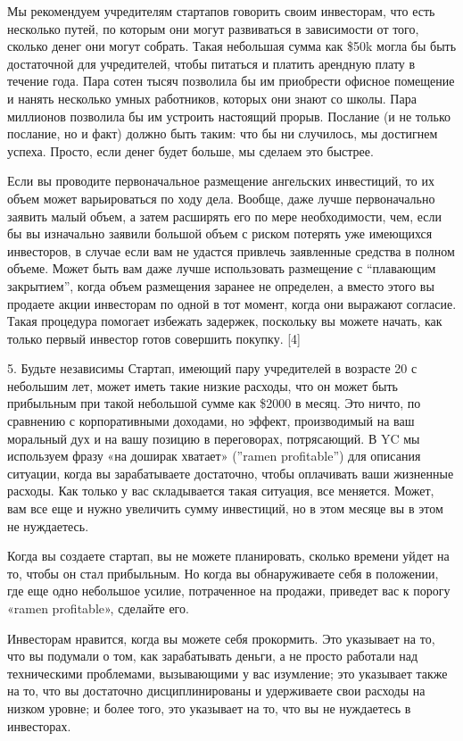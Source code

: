 \documentclass[ebook,12pt,oneside,openany]{memoir}
\begin{document}
Мы рекомендуем учредителям стартапов говорить своим инвесторам, что
есть несколько путей, по которым они могут развиваться в зависимости
от того, сколько денег они могут собрать. Такая небольшая сумма как
\$50k могла бы быть достаточной для учредителей, чтобы питаться и
платить арендную плату в течение года. Пара сотен тысяч позволила бы
им приобрести офисное помещение и нанять несколько умных работников,
которых они знают со школы. Пара миллионов позволила бы им устроить
настоящий прорыв. Послание (и не только послание, но и факт) должно
быть таким: что бы ни случилось, мы достигнем успеха. Просто, если
денег будет больше, мы сделаем это быстрее.

Если вы проводите первоначальное размещение ангельских инвестиций, то
их объем может варьироваться по ходу дела. Вообще, даже лучше
первоначально заявить малый объем, а затем расширять его по мере
необходимости, чем, если бы вы изначально заявили большой объем с
риском потерять уже имеющихся инвесторов, в случае если вам не удастся
привлечь заявленные средства в полном объеме. Может быть вам даже
лучше использовать размещение с “плавающим закрытием”, когда объем
размещения заранее не определен, а вместо этого вы продаете акции
инвесторам по одной в тот момент, когда они выражают согласие. Такая
процедура помогает избежать задержек, поскольку вы можете начать, как
только первый инвестор готов совершить покупку. [4]

5. Будьте независимы Стартап, имеющий пару учредителей в возрасте 20 с
небольшим лет, может иметь такие низкие расходы, что он может быть
прибыльным при такой небольшой сумме как \$2000 в месяц. Это ничто, по
сравнению с корпоративными доходами, но эффект, производимый на ваш
моральный дух и на вашу позицию в переговорах, потрясающий. В YC мы
используем фразу «на доширак хватает» (”ramen profitable”) для
описания ситуации, когда вы зарабатываете достаточно, чтобы оплачивать
ваши жизненные расходы. Как только у вас складывается такая ситуация,
все меняется. Может, вам все еще и нужно увеличить сумму инвестиций,
но в этом месяце вы в этом не нуждаетесь.

Когда вы создаете стартап, вы не можете планировать, сколько времени
уйдет на то, чтобы он стал прибыльным. Но когда вы обнаруживаете себя
в положении, где еще одно небольшое усилие, потраченное на продажи,
приведет вас к порогу «ramen profitable», сделайте его.

Инвесторам нравится, когда вы можете себя прокормить. Это указывает на
то, что вы подумали о том, как зарабатывать деньги, а не просто
работали над техническими проблемами, вызывающими у вас изумление; это
указывает также на то, что вы достаточно дисциплинированы и
удерживаете свои расходы на низком уровне; и более того, это указывает
на то, что вы не нуждаетесь в инвесторах.
\end{document}
